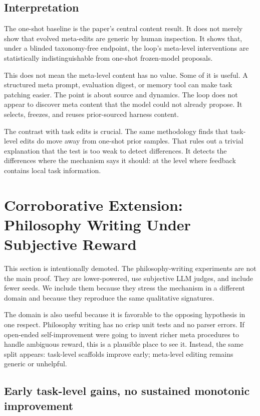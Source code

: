 \documentclass[11pt]{article}
\begin{document}
\subsection{Interpretation}\label{interpretation}

The one-shot baseline is the paper's central content result. It does not merely show that evolved meta-edits are generic by human inspection. It shows that, under a blinded taxonomy-free endpoint, the loop's meta-level interventions are statistically indistinguishable from one-shot frozen-model proposals.

This does not mean the meta-level content has no value. Some of it is useful. A structured meta prompt, evaluation digest, or memory tool can make task patching easier. The point is about source and dynamics. The loop does not appear to discover meta content that the model could not already propose. It selects, freezes, and reuses prior-sourced harness content.

The contrast with task edits is crucial. The same methodology finds that task-level edits do move away from one-shot prior samples. That rules out a trivial explanation that the test is too weak to detect differences. It detects the differences where the mechanism says it should: at the level where feedback contains local task information.

\section{Corroborative Extension: Philosophy Writing Under Subjective Reward}\label{corroborative-extension-philosophy-writing-under-subjective-reward}

This section is intentionally demoted. The philosophy-writing experiments are not the main proof. They are lower-powered, use subjective LLM judges, and include fewer seeds. We include them because they stress the mechanism in a different domain and because they reproduce the same qualitative signatures.

The domain is also useful because it is favorable to the opposing hypothesis in one respect. Philosophy writing has no crisp unit tests and no parser errors. If open-ended self-improvement were going to invent richer meta procedures to handle ambiguous reward, this is a plausible place to see it. Instead, the same split appears: task-level scaffolds improve early; meta-level editing remains generic or unhelpful.

\subsection{Early task-level gains, no sustained monotonic improvement}\label{early-task-level-gains-no-sustained-monotonic-improvement}
\end{document}
